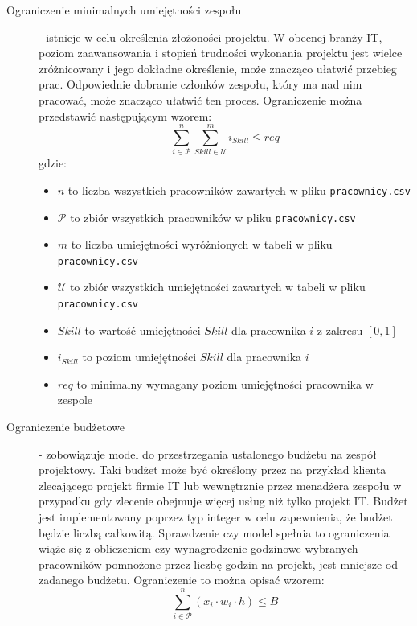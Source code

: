 \begin{description}
    \item[Ograniczenie minimalnych umiejętności zespołu] - istnieje w celu określenia złożoności projektu. W obecnej branży IT, poziom zaawansowania i stopień trudności wykonania projektu jest wielce zróżnicowany i jego dokładne określenie, może znacząco ułatwić przebieg prac. Odpowiednie dobranie członków zespołu, który ma nad nim pracować, może znacząco ułatwić ten proces. Ograniczenie można przedstawić następującym wzorem:
    \[
        \sum_{i \in \mathcal{P}}^{n} \sum_{Skill \in \mathcal{U}}^{m} i_{Skill} \leq req
    \]
    gdzie:
    \begin{itemize}
        \item $n$ to liczba wszystkich pracowników zawartych w pliku \verb|pracownicy.csv|
        \item $\mathcal{P}$ to zbiór wszystkich pracowników w pliku \verb|pracownicy.csv|
        \item $m$ to liczba umiejętności wyróżnionych w tabeli w pliku \verb|pracownicy.csv|
        \item $\mathcal{U}$ to zbiór wszystkich umiejętności zawartych w tabeli w pliku \verb|pracownicy.csv|
        \item $Skill$ to wartość umiejętności $Skill$ dla pracownika $i$ z zakresu $[0,1]$
        \item $i_{Skill}$ to poziom umiejętności $Skill$ dla pracownika $i$
        \item $req$ to minimalny wymagany poziom umiejętności pracownika w zespole
    \end{itemize}
    
    \item[Ograniczenie budżetowe] - zobowiązuje model do przestrzegania ustalonego budżetu na zespół projektowy. Taki budżet może być określony przez na przykład klienta zlecającego projekt firmie IT lub wewnętrznie przez menadżera zespołu w przypadku gdy zlecenie obejmuje więcej usług niż tylko projekt IT. Budżet jest implementowany poprzez typ integer w celu zapewnienia, że budżet będzie liczbą całkowitą.
    Sprawdzenie czy model spełnia to ograniczenia wiąże się z obliczeniem czy wynagrodzenie godzinowe wybranych pracowników pomnożone przez liczbę godzin na projekt, jest mniejsze od zadanego budżetu. Ograniczenie to można opisać wzorem:
    \[
    \sum_{i \in \mathcal{P}}^{n} (x_i \cdot w_i \cdot h) \leq B
    \]
    

\end{description}
